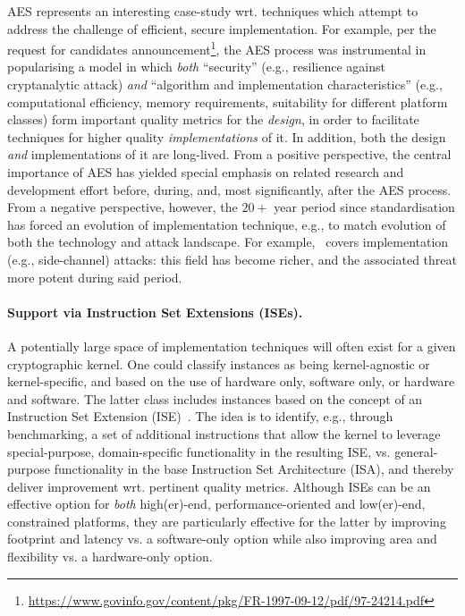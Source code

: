 AES represents an interesting case-study wrt. techniques which attempt to 
address the challenge of efficient, secure implementation.  For example,
per the request for candidates announcement\footnote{%
\url{https://www.govinfo.gov/content/pkg/FR-1997-09-12/pdf/97-24214.pdf}
}, the AES process was instrumental in popularising a model in which
{\em both}
``security''
(e.g., resilience against cryptanalytic attack)
{\em and}
``algorithm and implementation characteristics''
(e.g., computational efficiency, memory requirements, suitability for different platform classes)
form important quality metrics for the {\em design}, in order to facilitate
techniques for higher quality {\em implementations} of it.
In addition,
both the design {\em and} implementations of it are long-lived.
From a positive perspective, 
the central importance of AES has yielded special emphasis on related
research and development effort before, during, and, most significantly, 
after the AES process.
From a negative perspective, however,
the $20+$ year period since standardisation has forced an evolution of 
implementation technique, e.g., to match evolution of both the technology 
and attack landscape.  For example,~\cite[Section 3.6]{NBBBDFR:01} covers
implementation (e.g., side-channel) attacks: this field has become richer,
and the associated threat more potent during said period.


\paragraph{Support via Instruction Set Extensions (ISEs).}

A potentially large space of implementation techniques will often exist
for a given cryptographic kernel.  One could classify instances as being 
   kernel-agnostic
   or
   kernel-specific,
and based on the use of   
   hardware              only,
                software only,
   or
   hardware and software.
The latter class includes instances based on the concept of an
Instruction Set Extension (ISE)~\cite{BarGioMar:09,RegIen:16}.
The idea is to identify, e.g., through benchmarking, a set of additional 
instructions that allow the kernel to leverage
special-purpose, domain-specific functionality
in the resulting ISE,
vs. 
general-purpose                  functionality
in the base Instruction Set Architecture (ISA),
and thereby deliver improvement wrt. pertinent quality metrics.  
Although ISEs can be an effective option for {\em both}
high(er)-end, performance-oriented
and
 low(er)-end, constrained
platforms, 
they are particularly effective for the latter by 
improving footprint and latency
vs. a software-only option
while also
improving area      and flexibility
vs. a hardware-only option.

